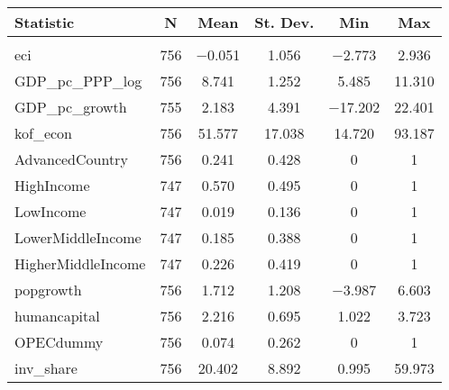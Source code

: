 
\begin{tabular}{@{\hspace{5pt}}lccccc} 
\toprule 
 
Statistic & \multicolumn{1}{c}{N} & \multicolumn{1}{c}{Mean} & \multicolumn{1}{c}{St. Dev.} & \multicolumn{1}{c}{Min} & \multicolumn{1}{c}{Max} \\ 
\midrule \\[-2.1ex] 
eci & 756 & $-$0.051 & 1.056 & $-$2.773 & 2.936 \\ 
GDP\_pc\_PPP\_log & 756 & 8.741 & 1.252 & 5.485 & 11.310 \\ 
GDP\_pc\_growth & 755 & 2.183 & 4.391 & $-$17.202 & 22.401 \\ 
kof\_econ & 756 & 51.577 & 17.038 & 14.720 & 93.187 \\ 
AdvancedCountry & 756 & 0.241 & 0.428 & 0 & 1 \\ 
HighIncome & 747 & 0.570 & 0.495 & 0 & 1 \\ 
LowIncome & 747 & 0.019 & 0.136 & 0 & 1 \\ 
LowerMiddleIncome & 747 & 0.185 & 0.388 & 0 & 1 \\ 
HigherMiddleIncome & 747 & 0.226 & 0.419 & 0 & 1 \\ 
popgrowth & 756 & 1.712 & 1.208 & $-$3.987 & 6.603 \\ 
humancapital & 756 & 2.216 & 0.695 & 1.022 & 3.723 \\ 
OPECdummy & 756 & 0.074 & 0.262 & 0 & 1 \\ 
inv\_share & 756 & 20.402 & 8.892 & 0.995 & 59.973 \\ 
\bottomrule 
\end{tabular} 
